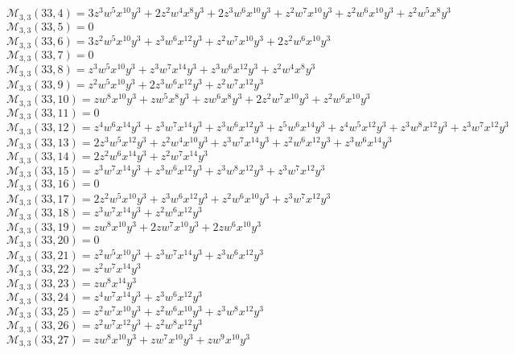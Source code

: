 \documentclass[12pt]{memoireuqam1.3}
\begin{document}
$\mathcal{M}_{3,3}(33,4)=3z^3w^5x^{10}y^3+2z^2w^4x^8y^3+2z^3w^6x^{10}y^3+z^2w^7x^{10}y^3+z^2w^6x^{10}y^3+z^2w^5x^8y^3$\\
$\mathcal{M}_{3,3}(33,5)=0$\\
$\mathcal{M}_{3,3}(33,6)=3z^2w^5x^{10}y^3+z^3w^6x^{12}y^3+z^2w^7x^{10}y^3+2z^2w^6x^{10}y^3$\\
$\mathcal{M}_{3,3}(33,7)=0$\\
$\mathcal{M}_{3,3}(33,8)=z^3w^5x^{10}y^3+z^3w^7x^{14}y^3+z^3w^6x^{12}y^3+z^2w^4x^8y^3$\\
$\mathcal{M}_{3,3}(33,9)=z^2w^5x^{10}y^3+2z^3w^6x^{12}y^3+z^2w^7x^{12}y^3$\\
$\mathcal{M}_{3,3}(33,10)=zw^8x^{10}y^3+zw^5x^8y^3+zw^6x^8y^3+2z^2w^7x^{10}y^3+z^2w^6x^{10}y^3$\\
$\mathcal{M}_{3,3}(33,11)=0$\\
$\mathcal{M}_{3,3}(33,12)=z^4w^6x^{14}y^3+z^3w^7x^{14}y^3+z^3w^6x^{12}y^3+z^5w^6x^{14}y^3+z^4w^5x^{12}y^3+z^3w^8x^{12}y^3+z^3w^7x^{12}y^3$\\
$\mathcal{M}_{3,3}(33,13)=2z^3w^5x^{12}y^3+z^2w^4x^{10}y^3+z^3w^7x^{14}y^3+z^2w^6x^{12}y^3+z^3w^6x^{14}y^3$\\
$\mathcal{M}_{3,3}(33,14)=2z^2w^6x^{14}y^3+z^2w^7x^{14}y^3$\\
$\mathcal{M}_{3,3}(33,15)=z^3w^7x^{14}y^3+z^3w^6x^{12}y^3+z^3w^8x^{12}y^3+z^3w^7x^{12}y^3$\\
$\mathcal{M}_{3,3}(33,16)=0$\\
$\mathcal{M}_{3,3}(33,17)=2z^2w^5x^{10}y^3+z^3w^6x^{12}y^3+z^2w^6x^{10}y^3+z^3w^7x^{12}y^3$\\
$\mathcal{M}_{3,3}(33,18)=z^3w^7x^{14}y^3+z^2w^6x^{12}y^3$\\
$\mathcal{M}_{3,3}(33,19)=zw^8x^{10}y^3+2zw^7x^{10}y^3+2zw^6x^{10}y^3$\\
$\mathcal{M}_{3,3}(33,20)=0$\\
$\mathcal{M}_{3,3}(33,21)=z^2w^5x^{10}y^3+z^3w^7x^{14}y^3+z^3w^6x^{12}y^3$\\
$\mathcal{M}_{3,3}(33,22)=z^2w^7x^{14}y^3$\\
$\mathcal{M}_{3,3}(33,23)=zw^8x^{14}y^3$\\
$\mathcal{M}_{3,3}(33,24)=z^4w^7x^{14}y^3+z^3w^6x^{12}y^3$\\
$\mathcal{M}_{3,3}(33,25)=z^2w^7x^{10}y^3+z^2w^6x^{10}y^3+z^3w^8x^{12}y^3$\\
$\mathcal{M}_{3,3}(33,26)=z^2w^7x^{12}y^3+z^2w^8x^{12}y^3$\\
$\mathcal{M}_{3,3}(33,27)=zw^8x^{10}y^3+zw^7x^{10}y^3+zw^9x^{10}y^3$\\
\end{document}
